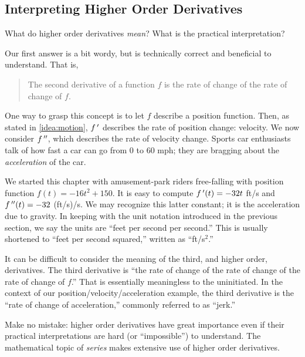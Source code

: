 \subsection{Interpreting Higher Order Derivatives}

What do higher order derivatives \emph{mean}? What is the practical interpretation? 

Our first answer is a bit wordy, but is technically correct and beneficial to understand. That is,
	\begin{quote}
	The second derivative of a function $f$ is the rate of change of the rate of change of $f$.
	\end{quote}

One way to grasp this concept is to let $f$ describe a position function. Then, as stated in \autoref{idea:motion}, $f\,'$ describes the rate of position change: velocity. We now consider $f\,''$, which describes the rate of velocity change. Sports car enthusiasts talk of how fast a car can go from 0 to 60 mph; they are bragging about the \emph{acceleration} of the car.

We started this chapter with amusement-park riders free-falling with position function $f(t) = -16t^2+150$. It is easy to compute $f\,'(t)=-32t$ ft/s and $f\,''(t) = -32$ (ft/s)/s. We may recognize this latter constant; it is the acceleration due to gravity. In keeping with the unit notation introduced in the previous section, we say the units are ``feet per second per second.'' This is usually shortened to ``feet per second squared,'' written as ``ft/s$^2$.''

It can be difficult to consider the meaning of the third, and higher order, derivatives. The third derivative is ``the rate of change of the rate of change of the rate of change of $f$.'' That is essentially meaningless to the uninitiated. In the context of our position/velocity/acceleration example, the third derivative is the ``rate of change of acceleration,'' commonly referred to as ``jerk.'' 

Make no mistake: higher order derivatives have great importance even if their practical interpretations are hard (or ``impossible'') to understand. The mathematical topic of \emph{series} makes extensive use of higher order derivatives.


